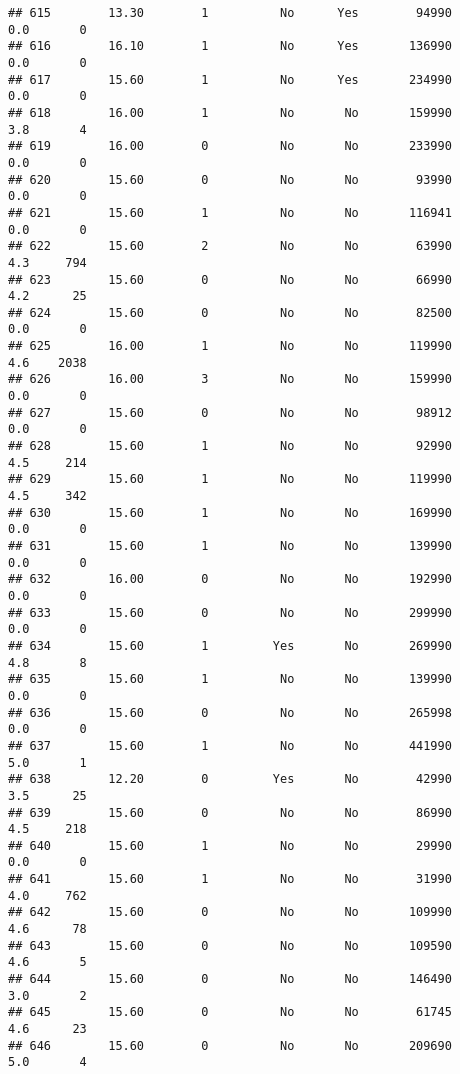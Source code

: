 \documentclass[
]{article}
\begin{document}
\begin{verbatim}
## 615        13.30        1          No      Yes        94990         0.0       0
## 616        16.10        1          No      Yes       136990         0.0       0
## 617        15.60        1          No      Yes       234990         0.0       0
## 618        16.00        1          No       No       159990         3.8       4
## 619        16.00        0          No       No       233990         0.0       0
## 620        15.60        0          No       No        93990         0.0       0
## 621        15.60        1          No       No       116941         0.0       0
## 622        15.60        2          No       No        63990         4.3     794
## 623        15.60        0          No       No        66990         4.2      25
## 624        15.60        0          No       No        82500         0.0       0
## 625        16.00        1          No       No       119990         4.6    2038
## 626        16.00        3          No       No       159990         0.0       0
## 627        15.60        0          No       No        98912         0.0       0
## 628        15.60        1          No       No        92990         4.5     214
## 629        15.60        1          No       No       119990         4.5     342
## 630        15.60        1          No       No       169990         0.0       0
## 631        15.60        1          No       No       139990         0.0       0
## 632        16.00        0          No       No       192990         0.0       0
## 633        15.60        0          No       No       299990         0.0       0
## 634        15.60        1         Yes       No       269990         4.8       8
## 635        15.60        1          No       No       139990         0.0       0
## 636        15.60        0          No       No       265998         0.0       0
## 637        15.60        1          No       No       441990         5.0       1
## 638        12.20        0         Yes       No        42990         3.5      25
## 639        15.60        0          No       No        86990         4.5     218
## 640        15.60        1          No       No        29990         0.0       0
## 641        15.60        1          No       No        31990         4.0     762
## 642        15.60        0          No       No       109990         4.6      78
## 643        15.60        0          No       No       109590         4.6       5
## 644        15.60        0          No       No       146490         3.0       2
## 645        15.60        0          No       No        61745         4.6      23
## 646        15.60        0          No       No       209690         5.0       4

\end{verbatim}
\end{document}
